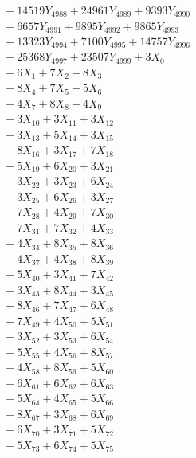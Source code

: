 \documentclass[a4paper,10pt]{article}
\begin{document}
{\begin{align}
&\;  + 14519 Y_{4988} + 24961 Y_{4989} + 9393 Y_{4990} \\[0.3ex]
&\;  + 6657 Y_{4991} + 9895 Y_{4992} + 9865 Y_{4993} \\[0.3ex]
&\;  + 13323 Y_{4994} + 7100 Y_{4995} + 14757 Y_{4996} \\[0.3ex]
&\;  + 25368 Y_{4997} + 23507 Y_{4999} + 3 X_{0} \\[0.3ex]
&\;  + 6 X_{1} + 7 X_{2} + 8 X_{3} \\[0.3ex]
&\;  + 8 X_{4} + 7 X_{5} + 5 X_{6} \\[0.3ex]
&\;  + 4 X_{7} + 8 X_{8} + 4 X_{9} \\[0.5ex]\allowbreak
&\;  + 3 X_{10} + 3 X_{11} + 3 X_{12} \\[0.3ex]
&\;  + 3 X_{13} + 5 X_{14} + 3 X_{15} \\[0.3ex]
&\;  + 8 X_{16} + 3 X_{17} + 7 X_{18} \\[0.3ex]
&\;  + 5 X_{19} + 6 X_{20} + 3 X_{21} \\[0.3ex]
&\;  + 3 X_{22} + 3 X_{23} + 6 X_{24} \\[0.3ex]
&\;  + 3 X_{25} + 6 X_{26} + 3 X_{27} \\[0.3ex]
&\;  + 7 X_{28} + 4 X_{29} + 7 X_{30} \\[0.3ex]
&\;  + 7 X_{31} + 7 X_{32} + 4 X_{33} \\[0.3ex]
&\;  + 4 X_{34} + 8 X_{35} + 8 X_{36} \\[0.3ex]
&\;  + 4 X_{37} + 4 X_{38} + 8 X_{39} \\[0.5ex]\allowbreak
&\;  + 5 X_{40} + 3 X_{41} + 7 X_{42} \\[0.3ex]
&\;  + 3 X_{43} + 8 X_{44} + 3 X_{45} \\[0.3ex]
&\;  + 8 X_{46} + 7 X_{47} + 6 X_{48} \\[0.3ex]
&\;  + 7 X_{49} + 4 X_{50} + 5 X_{51} \\[0.3ex]
&\;  + 3 X_{52} + 3 X_{53} + 6 X_{54} \\[0.3ex]
&\;  + 5 X_{55} + 4 X_{56} + 8 X_{57} \\[0.3ex]
&\;  + 4 X_{58} + 8 X_{59} + 5 X_{60} \\[0.3ex]
&\;  + 6 X_{61} + 6 X_{62} + 6 X_{63} \\[0.3ex]
&\;  + 5 X_{64} + 4 X_{65} + 5 X_{66} \\[0.3ex]
&\;  + 8 X_{67} + 3 X_{68} + 6 X_{69} \\[0.5ex]\allowbreak
&\;  + 6 X_{70} + 3 X_{71} + 5 X_{72} \\[0.3ex]
&\;  + 5 X_{73} + 6 X_{74} + 5 X_{75} \\[0.3ex]

\end{align}}
\end{document}
